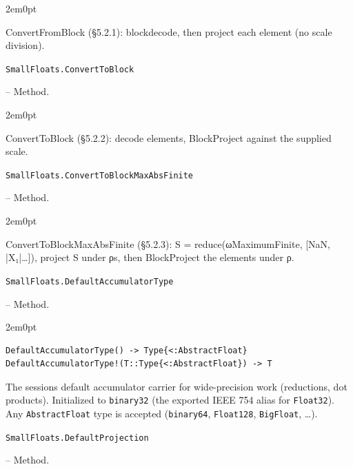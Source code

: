 \begin{adjustwidth}{2em}{0pt}

ConvertFromBlock (§5.2.1): blockdecode, then project each element (no scale division).



\end{adjustwidth}
\hypertarget{15271042205516165074}{\texttt{SmallFloats.ConvertToBlock}}  -- {Method.}

\begin{adjustwidth}{2em}{0pt}

ConvertToBlock (§5.2.2): decode elements, BlockProject against the supplied scale.



\end{adjustwidth}
\hypertarget{11716888295752982041}{\texttt{SmallFloats.ConvertToBlockMaxAbsFinite}}  -- {Method.}

\begin{adjustwidth}{2em}{0pt}

ConvertToBlockMaxAbsFinite (§5.2.3): S = reduce(ωMaximumFinite, [NaN, |X₁|…]), project S under ρs, then BlockProject the elements under ρ.



\end{adjustwidth}
\hypertarget{16754626316686161819}{\texttt{SmallFloats.DefaultAccumulatorType}}  -- {Method.}

\begin{adjustwidth}{2em}{0pt}


\begin{verbatim}
DefaultAccumulatorType() -> Type{<:AbstractFloat}
DefaultAccumulatorType!(T::Type{<:AbstractFloat}) -> T
\end{verbatim}

The session{\textquotesingle}s default accumulator carrier for wide-precision work (reductions, dot products). Initialized to \texttt{binary32} (the exported IEEE 754 alias for \texttt{Float32}). Any \texttt{AbstractFloat} type is accepted (\texttt{binary64}, \texttt{Float128}, \texttt{BigFloat}, …).



\end{adjustwidth}
\hypertarget{1645330464161432694}{\texttt{SmallFloats.DefaultProjection}}  -- {Method.}

